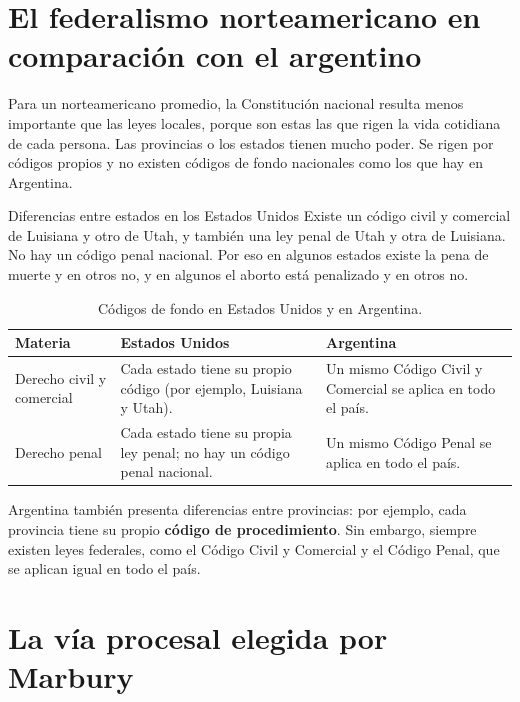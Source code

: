 \documentclass[12pt,oneside,a4paper]{book}
\begin{document}
\section{El federalismo norteamericano en comparación con el argentino}

Para un norteamericano promedio, la Constitución nacional resulta menos importante que las leyes locales, porque son estas las que rigen la vida cotidiana de cada persona. Las provincias o los estados tienen mucho poder. Se rigen por códigos propios y no existen códigos de fondo nacionales como los que hay en Argentina.

\begin{example}{Diferencias entre estados en los Estados Unidos}
Existe un código civil y comercial de Luisiana y otro de Utah, y también una ley penal de Utah y otra de Luisiana. No hay un código penal nacional. Por eso en algunos estados existe la pena de muerte y en otros no, y en algunos el aborto está penalizado y en otros no.
\end{example}

\begin{table}[H]
\centering
\begin{tabularx}{\textwidth}{
    >{\raggedright\arraybackslash}p{}
    >{\raggedright\arraybackslash}X
    >{\raggedright\arraybackslash}X
}
\toprule
\textbf{Materia} & \textbf{Estados Unidos} & \textbf{Argentina} \\
\midrule
Derecho civil y comercial & Cada estado tiene su propio código (por ejemplo, Luisiana y Utah). & Un mismo Código Civil y Comercial se aplica en todo el país. \\
\addlinespace
Derecho penal & Cada estado tiene su propia ley penal; no hay un código penal nacional. & Un mismo Código Penal se aplica en todo el país. \\
\bottomrule
\end{tabularx}
\caption{Códigos de fondo en Estados Unidos y en Argentina.}
\end{table}

Argentina también presenta diferencias entre provincias: por ejemplo, cada provincia tiene su propio \textbf{código de procedimiento}. Sin embargo, siempre existen leyes federales, como el Código Civil y Comercial y el Código Penal, que se aplican igual en todo el país.

\section{La vía procesal elegida por Marbury}
\end{document}
